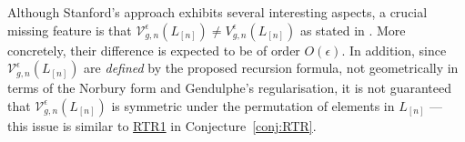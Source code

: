 \documentclass[12pt]{amsart}
\theoremstyle{plain}
\theoremstyle{definition}
\theoremstyle{remark}
\numberwithin{equation}{section}
\begin{document}

Although Stanford's approach exhibits several interesting aspects, a crucial missing feature is that $\mathcal{V}_{g,n}^{\epsilon}(L_{[n]})\neq {V}_{g,n}^{\epsilon}(L_{[n]})$ as stated in \cite{Sta23}. More concretely, their difference is expected to be of order $O(\epsilon)$. In addition, since $\mathcal{V}_{g,n}^{\epsilon}(L_{[n]})$ are \emph{defined} by the proposed recursion formula, not geometrically in terms of the Norbury form and Gendulphe's regularisation, it is not guaranteed that $\mathcal{V}_{g,n}^{\epsilon}(L_{[n]})$ is symmetric under the permutation of elements in $L_{[n]}$ --- this issue is similar to \hyperref[item:RTR1]{RTR1} in Conjecture~\ref{conj:RTR}.
\end{document}
